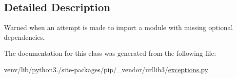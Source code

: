 \subsection{Detailed Description}
\begin{DoxyVerb}Warned when an attempt is made to import a module with missing optional
dependencies.
\end{DoxyVerb}
 

The documentation for this class was generated from the following file\+:\begin{DoxyCompactItemize}
\item 
venv/lib/python3./site-\/packages/pip/\+\_\+vendor/urllib3/\hyperlink{pip_2__vendor_2urllib3_2exceptions_8py}{exceptions.\+py}\end{DoxyCompactItemize}

